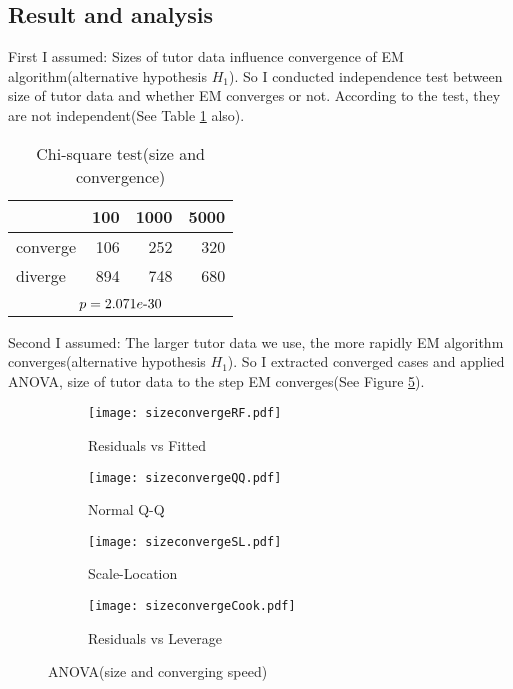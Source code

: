\documentclass[uplatex]{jsarticle}
\newcommand{\mathhyphen}{\mathchar`-}
\begin{document}
    \subsection{Result and analysis}
      \indent
	First I assumed: Sizes of tutor data influence convergence of EM algorithm(alternative hypothesis $H_1$). So I conducted independence test between size of tutor data and whether EM converges or not. According to the test, they are not independent(See Table \ref{tab:SandC} also).
	\begin{table}[h]
	  \centering
	  \caption{Chi-square test(size and convergence)}
	  \begin{tabular}{lrrr}
	    \hline
	    & 100 & 1000 & 5000
	    \\ \hline
	    converge & 106 & 252 & 320
	    \\
	    diverge & 894 & 748 & 680
	    \\ \hline
	    \rule{0pt}{1em}
	    \\ \hline \hline
	    \multicolumn{4}{c}{$p = 2.071e\mathhyphen 30$}
	    \\ \hline \hline
	  \end{tabular}
	  \label{tab:SandC}
	\end{table}
      \par
      \indent
	Second I assumed: The larger tutor data we use, the more rapidly EM algorithm converges(alternative hypothesis $H_1$). So I extracted converged cases and applied ANOVA, size of tutor data to the step EM converges(See Figure \ref{fig:anovaconverge}).
	\begin{figure}[h]
	\centering
	  \begin{subfigure}{0.48\columnwidth}
	  \centering
	  \texttt{[image: sizeconvergeRF.pdf]}
	  \caption{Residuals vs Fitted}
	  \label{fig:sizeconvergeRF}
	  \end{subfigure}
	  \begin{subfigure}{0.48\columnwidth}
	  \centering
	  \texttt{[image: sizeconvergeQQ.pdf]}
	  \caption{Normal Q-Q}
	  \label{fig:sizeconvergeQQ}
	  \end{subfigure}
	  \begin{subfigure}{0.48\columnwidth}
	  \centering
	  \texttt{[image: sizeconvergeSL.pdf]}
	  \caption{Scale-Location}
	  \label{fig:sizeconvergeSL}
	  \end{subfigure}
	  \begin{subfigure}{0.48\columnwidth}
	  \centering
	  \texttt{[image: sizeconvergeCook.pdf]}
	  \caption{Residuals vs Leverage}
	  \label{fig:sizeconvergeCook}
	  \end{subfigure}
	\caption{ANOVA(size and converging speed)}
	\label{fig:anovaconverge}
	\end{figure}
\end{document}
